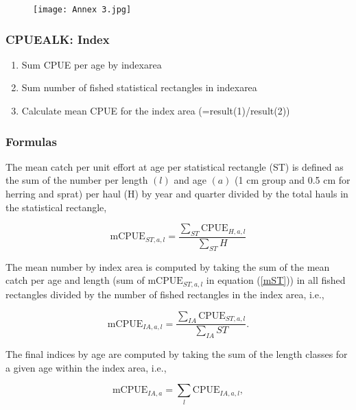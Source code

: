 \documentclass[useAMS,referee]{biom}
\numberwithin{equation}{section}
\begin{document}
\begin{figure}[h!]
\centering
\texttt{[image: Annex 3.jpg]}
\end{figure}

\subsubsection{CPUEALK: Index}
\begin{enumerate}
\item Sum CPUE per age by indexarea
\item Sum number of fished statistical rectangles in indexarea 
\item Calculate mean CPUE for the index area (=result(1)/result(2))  \\ 
\end{enumerate}
 


\subsubsection{Formulas}

The mean catch per unit effort at age per statistical rectangle (ST) is defined as the sum of the number per length $(l)$ and age $(a)$ (1 cm group and 0.5 cm for herring and sprat) per haul (H) by year and quarter divided by the total hauls in the statistical rectangle, 

\begin{equation}
\mathrm{mCPUE}_{ST, a, l} = \frac{\sum_{ST}\mathrm{CPUE}_{H,a,l}}{\sum_{ST} H}
\label{mST}
\end{equation}

The mean number by index area is computed by taking the sum of the mean catch per age and length (sum of $\mathrm{mCPUE}_{ST, a, l}$ in equation (\ref{mST})) in all fished rectangles divided by the number of fished rectangles in the index area, i.e.,

\begin{equation}
\mathrm{mCPUE}_{IA, a, l} = \frac{\sum_{IA}\mathrm{CPUE}_{ST,a,l}}{\sum_{IA} ST}.
\label{mIA}
\end{equation}

 The final indices by age are computed by taking the sum of the length classes for a given age within the index area, i.e.,

\begin{equation}
\mathrm{mCPUE}_{IA, a} = \sum_{l}\mathrm{CPUE}_{IA,a,l},
\label{mIA1}
\end{equation}
\end{document}
